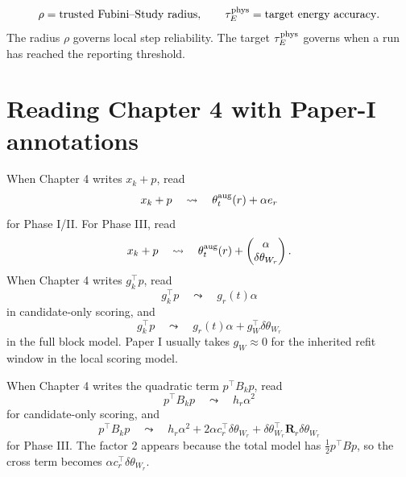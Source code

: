 \documentclass[10pt,twocolumn]{article}
\begin{document}
\begin{equation}
\rho
=\text{trusted Fubini--Study radius},
\qquad
\tau_E^{\rm phys}
=\text{target energy accuracy}.
\label{eq:rho_vs_tau}
\end{equation}
The radius \(\rho\) governs local step reliability. The target \(\tau_E^{\rm phys}\) governs when a run has reached the reporting threshold.

\section{Reading Chapter 4 with Paper-I annotations}

When Chapter 4 writes \(x_k+p\), read
\begin{equation}
x_k+p
\quad\leadsto\quad
\theta_t^{\rm aug}(r)+\alpha e_r
\label{eq:xkp_reading_scalar}
\end{equation}
for Phase I/II. For Phase III, read
\begin{equation}
x_k+p
\quad\leadsto\quad
\theta_t^{\rm aug}(r)
+\begin{pmatrix}
\alpha\\
\delta\theta_{W_r}
\end{pmatrix}.
\label{eq:xkp_reading_block}
\end{equation}
When Chapter 4 writes \(g_k^\top p\), read
\begin{equation}
g_k^\top p
\quad\leadsto\quad
g_r(t)\alpha
\label{eq:gtp_scalar_read}
\end{equation}
in candidate-only scoring, and
\begin{equation}
g_k^\top p
\quad\leadsto\quad
g_r(t)\alpha+g_W^\top\delta\theta_{W_r}
\label{eq:gtp_block_read}
\end{equation}
in the full block model. Paper I usually takes \(g_W\approx0\) for the inherited refit window in the local scoring model.

When Chapter 4 writes the quadratic term \(p^\top B_kp\), read
\begin{equation}
p^\top B_kp
\quad\leadsto\quad
h_r\alpha^2
\label{eq:quad_scalar_read}
\end{equation}
for candidate-only scoring, and
\begin{equation}
p^\top B_kp
\quad\leadsto\quad
h_r\alpha^2
+2\alpha c_r^\top\delta\theta_{W_r}
+\delta\theta_{W_r}^\top\mathbf R_r\delta\theta_{W_r}
\label{eq:quad_block_read}
\end{equation}
for Phase III. The factor \(2\) appears because the total model has \(\frac12p^\top Bp\), so the cross term becomes \(\alpha c_r^\top\delta\theta_{W_r}\).
\end{document}
